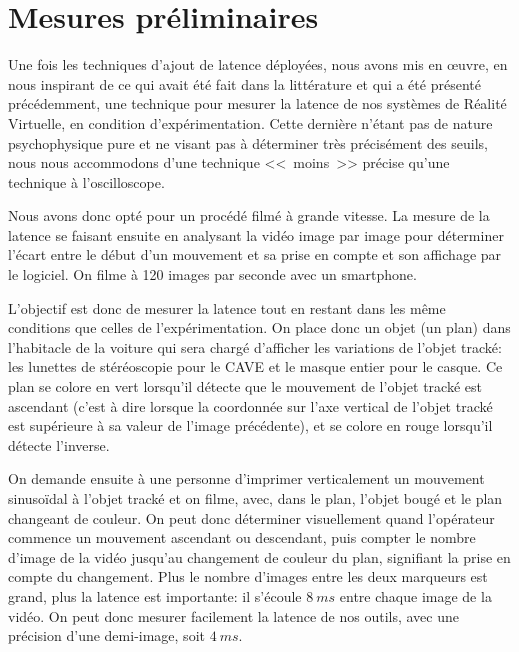 	
	\section{Mesures préliminaires}
	\label{sec:mesures_prelim_latence}
	\par Une fois les techniques d'ajout de latence déployées, nous avons mis en œuvre, en nous inspirant de ce qui avait été fait dans la littérature et qui a été présenté précédemment, une technique pour mesurer la latence de nos systèmes de Réalité Virtuelle, en condition d'expérimentation. Cette dernière n'étant pas de nature psychophysique pure et ne visant pas à déterminer très précisément des seuils, nous nous accommodons d'une technique <<~moins~>> précise qu'une technique à l'oscilloscope.
	
	\par Nous avons donc opté pour un procédé filmé à grande vitesse. La mesure de la latence se faisant ensuite en analysant la vidéo image par image pour déterminer l'écart entre le début d'un mouvement et sa prise en compte et son affichage par le logiciel. On filme à 120 images par seconde avec un smartphone.
	
	\par L'objectif est donc de mesurer la latence tout en restant dans les même conditions que celles de l'expérimentation. On place donc un objet (un plan) dans l'habitacle de la voiture qui sera chargé d'afficher les variations de l'objet tracké: les lunettes de stéréoscopie pour le CAVE et le masque entier pour le casque. Ce plan se colore en vert lorsqu'il détecte que le mouvement de l'objet tracké est ascendant (c'est à dire lorsque la coordonnée sur l'axe vertical de l'objet tracké est supérieure à sa valeur de l'image précédente), et se colore en rouge lorsqu'il détecte l'inverse.
	
	\par On demande ensuite à une personne d'imprimer verticalement un mouvement sinusoïdal à l'objet tracké et on filme, avec, dans le plan, l'objet bougé et le plan changeant de couleur. On peut donc déterminer visuellement quand l'opérateur commence un mouvement ascendant ou descendant, puis compter le nombre d'image de la vidéo jusqu'au changement de couleur du plan, signifiant la prise en compte du changement. Plus le nombre d'images entre les deux marqueurs est grand, plus la latence est importante: il s'écoule $8~ms$ entre chaque image de la vidéo. On peut donc mesurer facilement la latence de nos outils, avec une précision d'une demi-image, soit $4~ms$.
	
